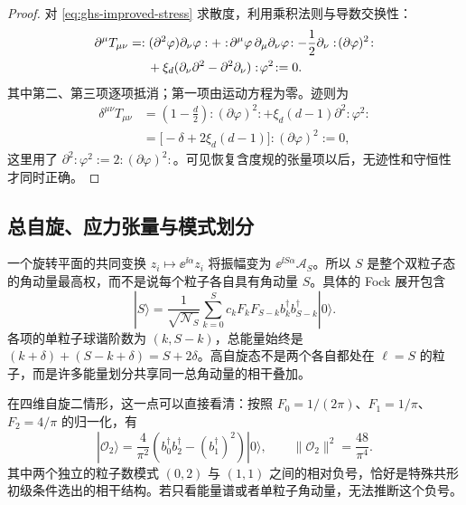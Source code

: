 \begin{proof}
对 \cref{eq:ghs-improved-stress} 求散度，利用乘积法则与导数交换性：
\begin{align*}
\partial^\mu T_{\mu\nu}
&=:(\partial^2\varphi)\partial_\nu\varphi:
+:\!\partial^\mu\varphi\,\partial_\mu\partial_\nu\varphi\!:
-\frac12\partial_\nu:\!(\partial\varphi)^2\!:\\
&\hspace{1.5em}+\xi_d(\partial_\nu\partial^2-\partial^2\partial_\nu):\!\varphi^2\!:
=0.
\end{align*}
其中第二、第三项逐项抵消；第一项由运动方程为零。迹则为
\begin{align*}
\delta^{\mu\nu}T_{\mu\nu}
&=\left(1-\frac d2\right):\!(\partial\varphi)^2\!:
+\xi_d(d-1)\partial^2:\!\varphi^2\!:\\
&=\bigl[-\delta+2\xi_d(d-1)\bigr]:\!(\partial\varphi)^2\!:=0,
\end{align*}
这里用了 $\partial^2:\!\varphi^2\!:=2:\!(\partial\varphi)^2\!:$。可见恢复含度规的张量项以后，无迹性和守恒性才同时正确。
\end{proof}

\subsection{总自旋、应力张量与模式划分}

一个旋转平面的共同变换 $z_i\mapsto\ee^{\ii\alpha}z_i$ 将振幅变为 $\ee^{\ii S\alpha}\mathcal A_S$。所以 $S$ 是整个双粒子态的角动量最高权，而不是说每个粒子各自具有角动量 $S$。具体的 Fock 展开包含
\begin{equation}\label{eq:ghs-two-mode-fock}
 |S\rangle=\frac1{\sqrt{\mathcal N_S}}
 \sum_{k=0}^S c_kF_kF_{S-k}
 b_k^\dagger b_{S-k}^\dagger|0\rangle.
\end{equation}
各项的单粒子球谐阶数为 $(k,S-k)$，总能量始终是 $(k+\delta)+(S-k+\delta)=S+2\delta$。高自旋态不是两个各自都处在 $\ell=S$ 的粒子，而是许多能量划分共享同一总角动量的相干叠加。

在四维自旋二情形，这一点可以直接看清：按照 $F_0=1/(2\pi)$、$F_1=1/\pi$、$F_2=4/\pi$ 的归一化，有
\begin{equation}\label{eq:ghs-spin-two-fock}
 |\mathcal O_2\rangle=\frac4{\pi^2}
 \left(b_0^\dagger b_2^\dagger-(b_1^\dagger)^2\right)|0\rangle,
 \qquad \|\mathcal O_2\|^2=\frac{48}{\pi^4}.
\end{equation}
其中两个独立的粒子数模式 $(0,2)$ 与 $(1,1)$ 之间的相对负号，恰好是特殊共形初级条件选出的相干结构。若只看能量谱或者单粒子角动量，无法推断这个负号。


